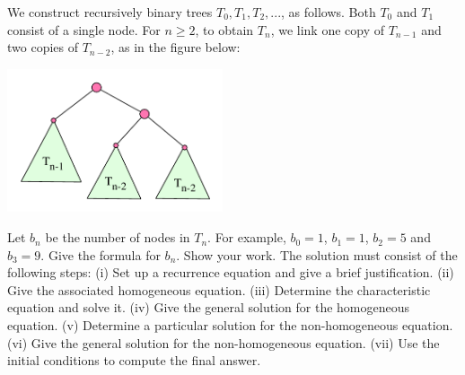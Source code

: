 \documentclass[11pt]{article}
\begin{document}

\medskip


\lineacross


\begin{problem}
	We construct recursively binary trees $T_0, T_1, T_2, ...$,
as follows. Both $T_0$ and $T_1$ consist of a single node.
For $n\ge 2$, to obtain $T_n$, we link
one copy of $T_{n-1}$ and two copies of
$T_{n-2}$, as in the figure below:

\begin{center}
\includegraphics[width=2.5in]{hw3_bin_tree.pdf}
\end{center}

Let $b_n$ be the number of nodes in $T_n$. For example,
$b_0 = 1$, $b_1 = 1$, $b_2 = 5$ and $b_3 = 9$. Give the
formula for $b_n$. Show your work.  The solution
must consist of the following steps:
(i) Set up a recurrence equation and give a brief justification.
(ii) Give the associated homogeneous equation.
(iii) Determine the characteristic equation and solve it.
(iv) Give the general solution for the homogeneous equation.
(v) Determine a particular solution for the non-homogeneous equation.
(vi) Give the general solution for the non-homogeneous equation.
(vii) Use the initial conditions to compute the final answer.
\end{problem}

\end{document}
